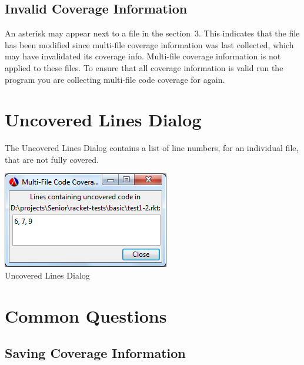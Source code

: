 \documentclass{article}
\newcommand{\sectionNewpage}{}
\newcommand{\ChapRef}[2]{\SecRef{#1}{#2}}
\newcommand{\SecRef}[2]{section~#1}
\newenvironment{SCentered}{\begin{trivlist}\item \centering}{\end{trivlist}}
\begin{document}
\subsection[Invalid Coverage Information]{Invalid Coverage Information}\label{t:x28part_x22Invalidx5fCoveragex5fInformationx22x29}

An asterisk may appear next to a file in the \ChapRef{3}{Covered Files Dialog}. This indicates that the file has been modified since multi{-}file coverage information was last collected, which may have invalidated its coverage info. Multi{-}file coverage information is not applied to these files. To ensure that all coverage information is valid run the program you are collecting multi{-}file code coverage for again.

\sectionNewpage

\section[Uncovered Lines Dialog]{Uncovered Lines Dialog}\label{t:x28part_x22Uncovered_Lines_Dialogx22x29}

The Uncovered Lines Dialog contains a list of line numbers, for an individual file, that are not fully covered.

\begin{SCentered}\includegraphics[scale=1.0]{uncovered-lines-dialog.png}
\\
Uncovered Lines Dialog\end{SCentered}

\sectionNewpage

\section[Common Questions]{Common Questions}\label{t:x28part_x22Commonx5fQuestionsx22x29}



\subsection[Saving Coverage Information]{Saving Coverage Information}\label{t:x28part_x22Savingx5fCoveragex5fInformationx22x29}
\end{document}
